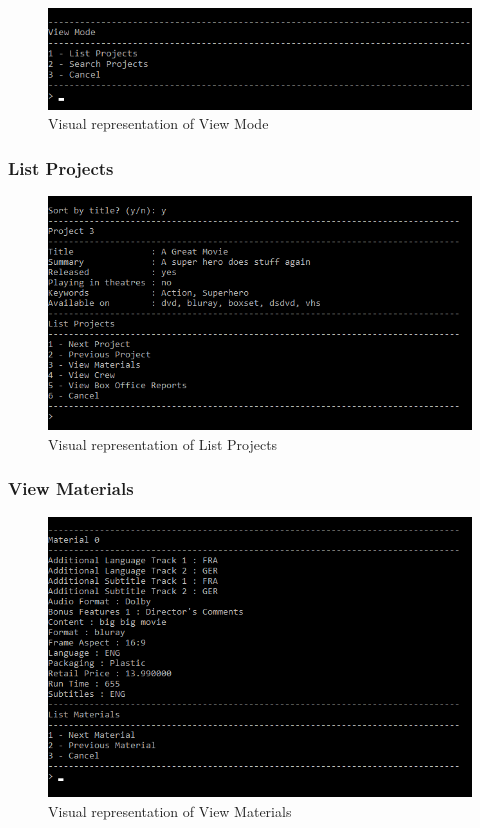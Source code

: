 \documentclass[
  english,
  a4paper,
,tablecaptionabove
]{scrartcl}
\begin{document}
\begin{figure}
\centering
\includegraphics{images/ui-screenshots/view-mode.png}
\caption{Visual representation of View Mode}
\end{figure}

\newpage

\hypertarget{list-projects}{%
\subsubsection{List Projects}\label{list-projects}}

\begin{figure}
\centering
\includegraphics{images/ui-screenshots/list-projects.png}
\caption{Visual representation of List Projects}
\end{figure}

\hypertarget{view-materials}{%
\subsubsection{View Materials}\label{view-materials}}

\begin{figure}
\centering
\includegraphics{images/ui-screenshots/list-projects-view-materials.png}
\caption{Visual representation of View Materials}
\end{figure}
\end{document}
